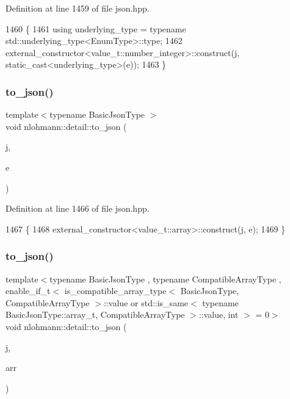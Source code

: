 Definition at line 1459 of file json.\+hpp.


\begin{DoxyCode}
1460 \{
1461     \textcolor{keyword}{using} underlying\_type = \textcolor{keyword}{typename} std::underlying\_type<EnumType>::type;
1462     external\_constructor<value\_t::number\_integer>::construct(j, static\_cast<underlying\_type>(e));
1463 \}
\end{DoxyCode}
\mbox{\label{namespacenlohmann_1_1detail_aeca6fb5fede5ed1e12a4420d98a5692b}} 
\subsubsection{\texorpdfstring{to\+\_\+json()}{to\_json()}\hspace{0.1cm}{\footnotesize\ttfamily [8/16]}}
{\footnotesize\ttfamily template$<$typename Basic\+Json\+Type $>$ \\
void nlohmann\+::detail\+::to\+\_\+json (\begin{DoxyParamCaption}\item[{Basic\+Json\+Type \&}]{j,  }\item[{const std\+::vector$<$ bool $>$ \&}]{e }\end{DoxyParamCaption})}



Definition at line 1466 of file json.\+hpp.


\begin{DoxyCode}
1467 \{
1468     external\_constructor<value\_t::array>::construct(j, e);
1469 \}
\end{DoxyCode}
\mbox{\label{namespacenlohmann_1_1detail_a3afebc132c5ff83f9cd160e52030fdfd}} 
\subsubsection{\texorpdfstring{to\+\_\+json()}{to\_json()}\hspace{0.1cm}{\footnotesize\ttfamily [9/16]}}
{\footnotesize\ttfamily template$<$typename Basic\+Json\+Type , typename Compatible\+Array\+Type , enable\+\_\+if\+\_\+t$<$ is\+\_\+compatible\+\_\+array\+\_\+type$<$ Basic\+Json\+Type, Compatible\+Array\+Type $>$\+::value or std\+::is\+\_\+same$<$ typename Basic\+Json\+Type\+::array\+\_\+t, Compatible\+Array\+Type $>$\+::value, int $>$  = 0$>$ \\
void nlohmann\+::detail\+::to\+\_\+json (\begin{DoxyParamCaption}\item[{Basic\+Json\+Type \&}]{j,  }\item[{const Compatible\+Array\+Type \&}]{arr }\end{DoxyParamCaption})}



